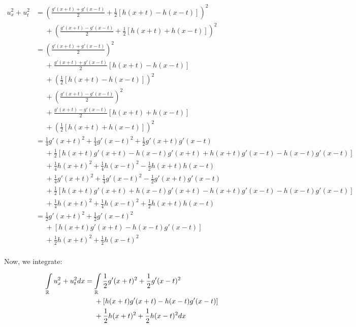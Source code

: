 \documentclass[a4paper,12pt]{article}
\begin{document}
\begin{align*}
u_x^2 + u_t^2 &= \left(\frac{g'(x+t)+g'(x-t)}{2} + \frac{1}{2}\left[h(x+t) - h(x-t)\right]\right)^2 \\
&\phantom{{}={}}+ \left(\frac{g'(x+t)-g'(x-t)}{2} + \frac{1}{2}\left[h(x+t) + h(x-t)\right]\right)^2\\
&= (\frac{g'(x+t)+g'(x-t)}{2})^2\\ &\phantom{{}={}}+ \frac{g'(x+t)+g'(x-t)}{2}\left[h(x+t) - h(x-t)\right]\\ &\phantom{{}={}}+ (\frac{1}{2}\left[h(x+t) - h(x-t)\right])^2 \\
&\phantom{{}={}}+ (\frac{g'(x+t)-g'(x-t)}{2})^2\\ &\phantom{{}={}}+\frac{g'(x+t)-g'(x-t)}{2}\left[h(x+t) + h(x-t)\right] \\&\phantom{{}={}}+ (\frac{1}{2}\left[h(x+t) + h(x-t)\right])^2\\
&= \frac{1}{4}g'(x+t)^2  + \frac{1}{4} g'(x-t)^2 + \frac{1}{2} g'(x+t)g'(x-t)\\ &\phantom{{}={}}+ \frac{1}{2}\left[h(x+t)g'(x+t) - h(x-t)g'(x+t) +h(x+t)g'(x-t) - h(x-t)g'(x-t) \right]\\ &\phantom{{}={}}+ \frac{1}{4}h(x+t)^2  + \frac{1}{4} h(x-t)^2 - \frac{1}{2} h(x+t)h(x-t)\\
&\phantom{{}={}}+ \frac{1}{4}g'(x+t)^2  + \frac{1}{4} g'(x-t)^2 - \frac{1}{2} g'(x+t)g'(x-t)\\ &\phantom{{}={}}+\frac{1}{2}\left[h(x+t)g'(x+t) + h(x-t)g'(x+t) -h(x+t)g'(x-t) - h(x-t)g'(x-t) \right] \\&\phantom{{}={}}+ \frac{1}{4}h(x+t)^2  + \frac{1}{4} h(x-t)^2 + \frac{1}{2} h(x+t)h(x-t)\\
&= \frac{1}{2}g'(x+t)^2  + \frac{1}{2} g'(x-t)^2 \\ &\phantom{{}={}}+ \left[h(x+t)g'(x+t) -h(x-t)g'(x-t)\right]\\ &\phantom{{}={}}+ \frac{1}{2}h(x+t)^2  + \frac{1}{2} h(x-t)^2\\
\end{align*}

Now, we integrate:

\begin{align*}
\int\limits_\R u_x^2 + u_t^2 dx &= \int\limits_\R \frac{1}{2}g'(x+t)^2  + \frac{1}{2} g'(x-t)^2 \\ &\phantom{{}={}}+ \left[h(x+t)g'(x+t) -h(x-t)g'(x-t)\right]\\ &\phantom{{}={}}+ \frac{1}{2}h(x+t)^2  + \frac{1}{2} h(x-t)^2 dx
\end{align*}
\end{document}
